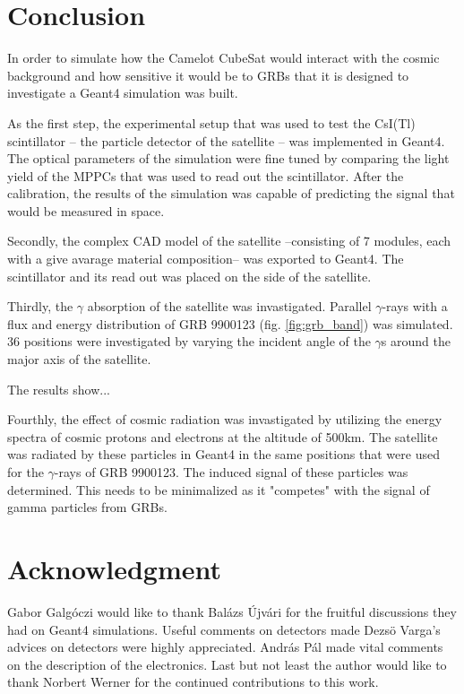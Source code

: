 \documentclass[12pt, a4paper,titlepage]{article}
\numberwithin{equation}{section}
\numberwithin{figure}{section}
\begin{document}
\pagebreak

\section{Conclusion}

In order to simulate how the Camelot CubeSat would interact with the cosmic background and how sensitive it would be to GRBs that it is designed to investigate a Geant4 simulation was built.

As the first step, the experimental setup that was used to test the CsI(Tl) scintillator -- the particle detector of the satellite -- was implemented in Geant4. The optical parameters of the simulation were fine tuned by comparing the light yield of the MPPCs that was used to read out the scintillator. After the calibration, the results of the simulation was capable of predicting the signal that would be measured in space.

Secondly, the complex CAD model of the satellite --consisting of 7 modules, each with a give avarage material composition-- was exported to Geant4. The scintillator and its read out was placed on the side of the satellite.

Thirdly, the $\gamma$ absorption of the satellite was invastigated. Parallel $\gamma$-rays with a flux and energy distribution of GRB 9900123 (fig. \ref{fig:grb_band}) was simulated. 36 positions were investigated by varying the incident angle of the $\gamma$s around the major axis of the satellite.

The results show...


Fourthly, the effect of cosmic radiation was invastigated by utilizing the energy spectra of cosmic protons and electrons at the altitude of 500km. The satellite was radiated by these particles in Geant4 in the same positions that were used for the $\gamma$-rays of GRB 9900123. The induced signal of these particles was determined. This needs to be minimalized as it "competes" with the signal of gamma particles from GRBs.


\pagebreak

\section{Acknowledgment}

Gabor Galg\'oczi would like to thank Bal\'azs \'Ujv\'ari for the fruitful discussions they had on Geant4 simulations. Useful comments on detectors made Dezs\"o Varga's advices on detectors were highly appreciated. András Pál made vital comments on the description of the electronics. Last but not least the author would like to thank Norbert Werner for the continued contributions to this work.
\end{document}
